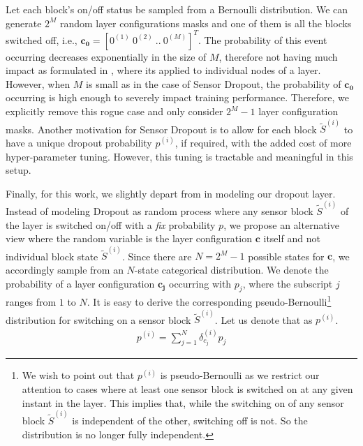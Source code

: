 \documentclass[../thesis.tex]{subfiles}
\begin{document}
Let each block's on/off status be sampled from a Bernoulli distribution. We can generate $2^M$ random layer configurations masks and one of them is all the blocks switched off, i.e.,  $\mathbf{{c_0}} = [0^{(1)}~0^{(2)}~..~0^{(M)}]^T$. The probability of this event occurring decreases exponentially in the size of $M$, therefore not having much impact as formulated in \citet{dropout}, where its applied to individual nodes of a layer. However, when $M$ is small as in the case of Sensor Dropout, the probability of $\mathbf{{c_0}}$ occurring is high enough to severely impact training performance. Therefore, we explicitly remove this rogue case and only consider $2^M-1$ layer configuration masks. 
%
Another motivation for Sensor Dropout is to allow for each block $\tilde{S}^{(i)}$ to have a unique dropout probability $p^{(i)}$, if required, with the added cost of more hyper-parameter tuning. However, this tuning is tractable and meaningful in this setup.


Finally, for this work, we slightly depart from \citet{dropout} in modeling our dropout layer. Instead of modeling Dropout as random process where any sensor block $\tilde{S}^{(i)}$ of the layer is switched on/off with a \textit{fix} probability $p$, we propose an alternative view where the random variable is the layer configuration $\mathbf{c}$ itself and not individual block state $\tilde{S}^{(i)}$. Since there are $N = 2^M - 1$ possible states for $\mathbf{c}$, we accordingly sample from an $N$-state categorical distribution. We denote the probability of a layer configuration $\mathbf{{c_j}}$ occurring with $p_j$, where the subscript $j$ ranges from $1$ to $N$. It is easy to derive the corresponding pseudo-Bernoulli\footnote{ We wish to point out that $p^{(i)}$ is pseudo-Bernoulli as we restrict our attention to cases where at least one sensor block is switched on at any given instant in the layer. This implies that, while the switching on of any sensor block $\tilde{S}^{(i)}$ is independent of the other, switching off is not. So the distribution is no longer fully independent.} distribution for switching on a sensor block $\tilde{S}^{(i)}$. Let us denote that as $p^{(i)}$. 
\begin{align}
{p}^{(i)} = \sum_{j=1}^N\delta_{c_j}^{(i)} p_j
\end{align}
\end{document}
